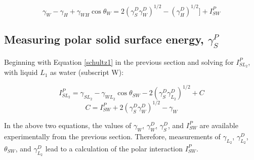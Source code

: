 \begin{equation} 
\label{schultz2}
	\gamma_{W}-\gamma_{H}+\gamma_{WH}\cos\theta_{W} = 2(\gamma_{S}^{D}\gamma_{W}^{D})^{1/2}-(\gamma_{H}^{D})^{1/2}] + I_{SW}^{P} 
\end{equation} 

\subsection{Measuring polar solid surface energy, $\gamma_{S}^{P}$}

Beginning with Equation \ref{schultz1} in the previous section and solving for $ I_{SL_{2}}^{P} $, with liquid $L_1$ as water (subscript W):

\begin{equation}
	I_{SL_2}^{P} = \gamma_{SL_2}-\gamma_{WL_2}\cos\theta_{SW}-2(\gamma_{S}^{D}\gamma_{L_2}^{D})^{1/2} + C
\end{equation}
\begin{equation}
	C = I_{SW}^{P} + 2(\gamma_{S}^{D}\gamma_{W}^{D})^{1/2} - \gamma_W
\end{equation}

In the above two equations, the values of $ \gamma_W$, $ \gamma_{W}^{D} $, $ \gamma_{S}^{D} $, and $I_{SW}^{P}$ are available experimentally from the previous section. Therefore, measurements of $ \gamma_{L_2}$, $ \gamma_{L_2}^{D} $, $\theta_{SW}$, and $ \gamma_{L_2}^{D} $ lead to a calculation of the polar interaction $I_{SW}^{P}$. 





